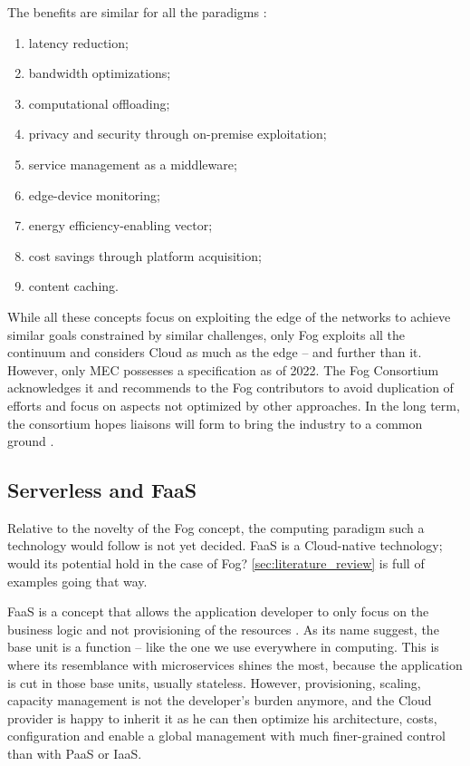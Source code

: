 \documentclass[11pt]{sdm}
\begin{document}
The benefits are similar for all the paradigms \cite{ahmed_fog_2019, ai_edge_2018}:
\begin{enumerate}[(1)]
	\item latency reduction;
	\item bandwidth optimizations;
	\item computational offloading;
	\item privacy and security through on-premise exploitation;
	\item service management as a middleware;
	\item edge-device monitoring;
	\item energy efficiency-enabling vector;
	\item cost savings through platform acquisition;
	\item content caching.
\end{enumerate}

While all these concepts focus on exploiting the edge of the networks to achieve similar goals constrained by similar challenges, only Fog exploits all the continuum and considers Cloud as much as the edge -- and further than it. However, only \gls{MEC} possesses a specification as of 2022. The Fog Consortium acknowledges it and recommends to the Fog contributors to avoid duplication of efforts and focus on aspects not optimized by other approaches. In the long term, the consortium hopes liaisons will form to bring the industry to a common ground \cite{ieee_standards_association_ieee_2018}.

\hypersetup{linkcolor=}
\subsection{Serverless and \acrfull{FaaS}}

Relative to the novelty of the Fog concept, the computing paradigm such a technology would follow is not yet decided. \gls{FaaS} is a Cloud-native technology; would its potential hold in the case of Fog? \cref{sec:literature_review} is full of examples going that way.

\gls{FaaS} is a concept that allows the application developer to only focus on the business logic and not provisioning of the resources \cite{redhat_what_2020}. As its name suggest, the base unit is a function -- like the one we use everywhere in computing. This is where its resemblance with microservices shines the most, because the application is cut in those base units, usually stateless. However, provisioning, scaling, capacity management is not the developer's burden anymore, and the Cloud provider is happy to inherit it as he can then optimize his architecture, costs, configuration and enable a global management with much finer-grained control than with \gls{PaaS} or \gls{IaaS}.
\end{document}
